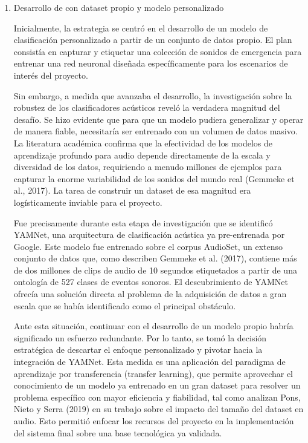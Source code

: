 \begin{enumerate}
      \item Desarrollo de con dataset propio y modelo personalizado

            Inicialmente, la estrategia se centró en el desarrollo de un modelo de clasificación personalizado a partir de un conjunto de datos propio. El plan consistía en capturar y etiquetar una colección de sonidos de emergencia para entrenar una red neuronal diseñada específicamente para los escenarios de interés del proyecto.

            Sin embargo, a medida que avanzaba el desarrollo, la investigación sobre la robustez de los clasificadores acústicos reveló la verdadera magnitud del desafío. Se hizo evidente que para que un modelo pudiera generalizar y operar de manera fiable, necesitaría ser entrenado con un volumen de datos masivo. La literatura académica confirma que la efectividad de los modelos de aprendizaje profundo para audio depende directamente de la escala y diversidad de los datos, requiriendo a menudo millones de ejemplos para capturar la enorme variabilidad de los sonidos del mundo real (Gemmeke et al., 2017). La tarea de construir un dataset de esa magnitud era logísticamente inviable para el proyecto.

            Fue precisamente durante esta etapa de investigación que se identificó YAMNet, una arquitectura de clasificación acústica ya pre-entrenada por Google. Este modelo fue entrenado sobre el corpus AudioSet, un extenso conjunto de datos que, como describen Gemmeke et al. (2017), contiene más de dos millones de clips de audio de 10 segundos etiquetados a partir de una ontología de 527 clases de eventos sonoros. El descubrimiento de YAMNet ofrecía una solución directa al problema de la adquisición de datos a gran escala que se había identificado como el principal obstáculo.

            Ante esta situación, continuar con el desarrollo de un modelo propio habría significado un esfuerzo redundante. Por lo tanto, se tomó la decisión estratégica de descartar el enfoque personalizado y pivotar hacia la integración de YAMNet. Esta medida es una aplicación del paradigma de aprendizaje por transferencia (transfer learning), que permite aprovechar el conocimiento de un modelo ya entrenado en un gran dataset para resolver un problema específico con mayor eficiencia y fiabilidad, tal como analizan Pons, Nieto y Serra (2019) en su trabajo sobre el impacto del tamaño del dataset en audio. Esto permitió enfocar los recursos del proyecto en la implementación del sistema final sobre una base tecnológica ya validada.


\end{enumerate}
